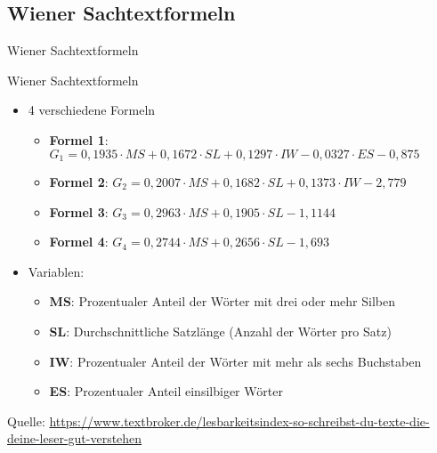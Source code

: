 \documentclass[
	aspectratio=169, %
	8pt, %
]{beamer}
\begin{document}
\subsection{Wiener Sachtextformeln}
\begin{frame}[fragile]{Wiener Sachtextformeln}

	\begin{definition}{Wiener Sachtextformeln}
		\begin{itemize}
			\item 4 verschiedene Formeln
			\begin{itemize}
				\item \textbf{Formel 1}: $G_1 = 0{,}1935 \cdot MS + 0{,}1672 \cdot SL + 0{,}1297 \cdot IW - 0{,}0327 \cdot ES - 0{,}875 $
				\item \textbf{Formel 2}:  
				$G_2 = 0{,}2007 \cdot MS + 0{,}1682 \cdot SL + 0{,}1373 \cdot IW - 2{,}779 $
				\item \textbf{Formel 3}:  
				$G_3 = 0{,}2963 \cdot MS + 0{,}1905 \cdot SL - 1{,}1144 $
				\item \textbf{Formel 4}:  
				$G_4 = 0{,}2744 \cdot MS + 0{,}2656 \cdot SL - 1{,}693 $
			\end{itemize}
			\item Variablen:
			\begin{itemize}
				\item \textbf{MS}: Prozentualer Anteil der Wörter mit drei oder mehr Silben  
				\item \textbf{SL}: Durchschnittliche Satzlänge (Anzahl der Wörter pro Satz)  
				\item \textbf{IW}: Prozentualer Anteil der Wörter mit mehr als sechs Buchstaben  
				\item \textbf{ES}: Prozentualer Anteil einsilbiger Wörter  
			\end{itemize}
		\end{itemize}

	\end{definition}

	{\tiny Quelle: \url{https://www.textbroker.de/lesbarkeitsindex-so-schreibst-du-texte-die-deine-leser-gut-verstehen}}

\end{frame}
\end{document}
